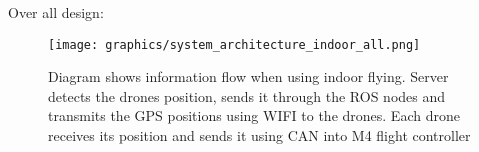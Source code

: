 Over all design:
\begin{figure}[H]
    \center
    \texttt{[image: graphics/system\_architecture\_indoor\_all.png]}
    \caption{Diagram shows information flow when using indoor flying. Server detects the drones position, sends it through the ROS nodes and transmits the GPS positions using WIFI to the drones. Each drone receives its position and sends it using CAN into M4 flight controller}
    \label{fig:PCB_block}
\end{figure}